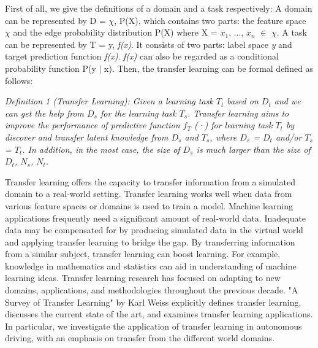 First of all, we give the definitions of a domain and a task respectively: A domain can be represented by D = {$\chi$, P(X)}, which contains two parts: the feature space $\chi$ and the edge probability distribution P(X) where X = {$x_1$, ..., $x_n$} $\in$ $\chi$. A task can be represented by T = {y, \emph{f(x)}}. It consists of two parts: label space \emph{y} and target prediction function \emph{f(x)}. \emph{f(x)} can also be regarded as a conditional probability function {P(y $\mid$ x)}. Then, the transfer learning can be formal defined as follows:

\emph{Definition 1 (Transfer Learning): Given a learning task $T_t$ based on $D_t$ and we can get the help from $D_s$ for the learning task $T_s$. Transfer learning aims to improve the performance of predictive function $f_T$ (·) for learning task $T_t$ by discover and transfer latent knowledge from $D_s$ and $T_s$, where $D_s$ = $D_t$ and/or $T_s$ = $T_t$. In addition, in the most case, the size of $D_s$ is much larger than the size of $D_t$, $N_s$, $N_t$.}\cite{tan2018survey}

Transfer learning offers the capacity to transfer information from a simulated domain to a real-world setting. Transfer learning works well when data from various feature spaces or domains is used to train a model. Machine learning applications frequently need a significant amount of real-world data. Inadequate data may be compensated for by producing simulated data in the virtual world and applying transfer learning to bridge the gap.\cite{akhauri2020enhanced} By transferring information from a similar subject, transfer learning can boost learning. For example, knowledge in mathematics and statistics can aid in understanding of machine learning ideas. Transfer learning research has focused on adapting to new domains, applications, and methodologies throughout the previous decade. "A Survey of Transfer Learning" by Karl Weiss\cite{5288526} explicitly defines transfer learning, discusses the current state of the art, and examines transfer learning applications. In particular, we investigate the application of transfer learning in autonomous driving, with an emphasis on transfer from the different world domains.

